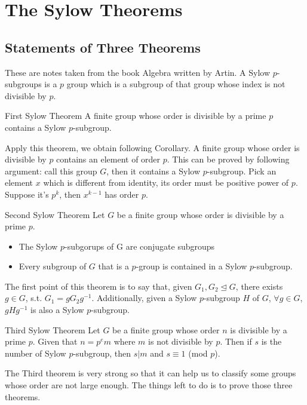 \documentclass{article}
\begin{document}
\section{The Sylow Theorems}
\subsection{Statements of Three Theorems}
These are notes taken from the book Algebra written by Artin. A Sylow $p$-subgroups is a $p$ group which is a subgroup of that group whose
index is not divisible by $p$.
\begin{thm}{First Sylow Theorem}
    A finite group whose order is divisible by a prime $p$ contains a Sylow $p$-subgroup.
\end{thm}
Apply this theorem, we obtain following Corollary. A finite group whose order is divisible by $p$ contains an element of order $p$. This 
can be proved by following argument: call this group $G$, then it contains a Sylow $p$-subgroup. Pick an element $x$ which is different from identity, 
its order must be positive power of $p$. Suppose it's $p^k$, then $x^{k -1}$ has order $p$.
\begin{thm}{Second Sylow Theorem}
    Let $G$ be a finite group whose order is divisible by a prime $p$.
    \begin{itemize}
        \item The Sylow $p$-subgorups of G are conjugate subgroups
        \item Every subgroup of $G$ that is a $p$-group is contained in a Sylow $p$-subgroup.
    \end{itemize}
\end{thm}
The first point of this theorem is to say that, given $G_1, G_2 \unlhd G$, there exists $g \in G$, s.t. $G_1 = g G_2 g^{-1}$. Additionally, given a Sylow $p$-subgroup $H$
of $G$, $\forall g \in G$, $g H g^{-1}$ is also a Sylow $p$-subgroup. 
\begin{thm}{Third Sylow Theorem}
    Let $G$ be a finite group whose order $n$ is divisible by a prime $p$. Given that $n = p^e m$ where $m$ is not divisible by $p$. Then if $s$ is the number of Sylow $p$-subgroup, 
   then $s | m$ and $s \equiv 1$ (mod $p$).
\end{thm}
The Third theorem is very strong so that it can help us to classify some groups whose order are not large enough. The things left to do is to prove those three theorems.
\end{document}
